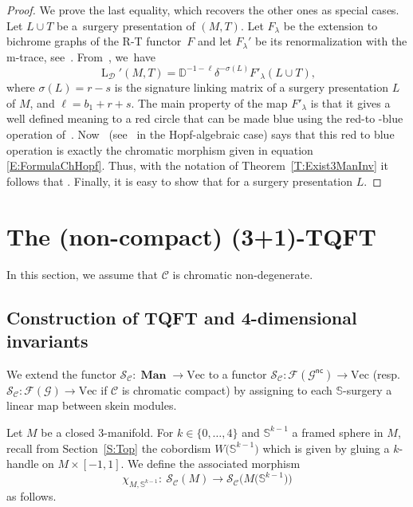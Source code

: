 \documentclass[10pt,a4paper]{amsart}
\numberwithin{equation}{section}
\numberwithin{theorem}{section}
\numberwithin{proposition}{section}
\numberwithin{definition}{section}
\numberwithin{lemma}{section}
\numberwithin{corollary}{section}
\numberwithin{remark}{section}
\numberwithin{example}{section}
\newcommand{\cat}{\mathcal{C}}
\newcommand{\catd}{\mathcal{D}}
\newcommand{\TSkein}{{\mathscr{S}}}
\newcommand{\Vect}{\mathrm{Vec}}
\newcommand{\nc}[1]{{#1^{\mathsf{nc}}}}
\newcommand{\man}{\operatorname{\textbf{Man}}}
\newcommand{\Sp}{\mathbb{S}}
\begin{document}
 \begin{proof}
We prove the last equality, which recovers the other ones as special cases. Let ${L\cup T}$ be a~surgery presentation of $(M,T)$. Let $F_\lambda$ be the extension to bichrome graphs of the R-T functor~$F$ and let $F_\lambda'$ be its renormalization with the m-trace, see~\cite{DRGGPMR2022, DRGPM18}. From~\cite[Theorem~3.8]{DRGGPMR2022}, we~have%
\[
\operatorname{L}_\catd'(M,T)= \mathbb{D}^{-1 - \ell} \delta^{- \sigma(L)} F'_{\lambda}(L\cup T),
\]
where $\sigma(L)=r-s$ is the signature linking matrix of a surgery presentation $L$ of $M$,  and $\ell=b_1+r+s$.
The main property of the map $F'_\lambda$ is that it gives a well defined meaning to a red circle that can be made blue using the red-to -blue operation of~\cite{DRGGPMR2022}.
Now~\cite{CGPV2023b} (see~\cite[Lemma 6.3]{CGPT20} in the Hopf-algebraic case) says that this red to blue operation is exactly the chromatic morphism given in equation \eqref{E:FormulaChHopf}. Thus, with the notation of Theorem~\ref{T:Exist3ManInv} it follows that .
Finally, it is easy to show that  for a surgery presentation $L$.
\end{proof}


\section{The (non-compact) (3+1)-TQFT}%
In this section, we assume that $\cat$ is
chromatic non-degenerate.

\subsection{Construction of TQFT and 4-dimensional invariants}
We extend the functor $\TSkein_\cat\colon\man\to \Vect$ to a
functor $\TSkein_\cat\colon \mathcal{F}(\nc{\mathcal{G}})\to \Vect$
(resp.~$\TSkein_\cat\colon \mathcal{F}(\mathcal{G})\to \Vect$ if
$\cat$ is chromatic compact)
by assigning to each $\Sp$-surgery a
linear map between skein modules.

Let $M$ be a closed 3-manifold. For $k\in \{0,\dots ,4\}$ and $\Sp^{k-1}$ a framed sphere in $M$, recall from Section~\ref{S:Top} the cobordism $W\bigl(\Sp^{k-1}\bigr)$ which is given by gluing a $k$-handle on $M\times [-1,1]$. We define the associated morphism
\[\chi _{M,{\Sp^{k-1}}}\colon\ \TSkein_\cat(M)\to\TSkein_\cat\bigl(M\bigl({\Sp^{k-1}}\bigr)\bigr)\]
as follows.
\end{document}
